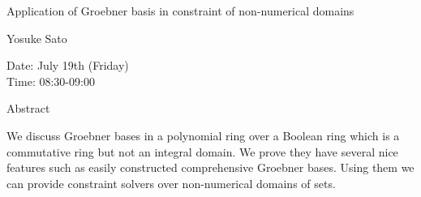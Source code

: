 \begin{center}
\LARGE
Application of Groebner basis in constraint of
                    non-numerical domains
\end{center}

\begin{center}
\Large
Yosuke Sato

\end{center}

\noindent
Date:  July 19th (Friday)\\
Time:  08:30-09:00\\

\begin{center}
\large
Abstract
\end{center}

We discuss Groebner bases in a polynomial ring over a Boolean ring which is a commutative ring
but not an integral domain. We prove they have several nice features such as easily constructed
comprehensive Groebner bases. Using them we can provide constraint solvers over non-numerical
domains of sets. 
